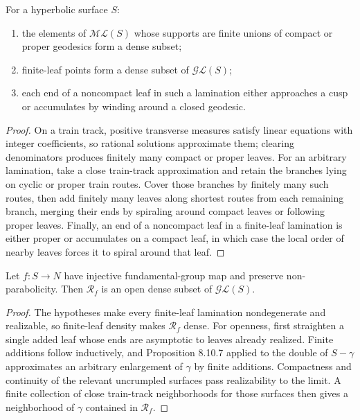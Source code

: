 \begin{proposition}
\label{thurston-ch08-finite-leaf-density}
For a hyperbolic surface $S$:
\begin{enumerate}
\item the elements of $\mathcal{ML}(S)$ whose supports are finite unions of compact or proper geodesics form a dense subset;
\item finite-leaf points form a dense subset of $\mathcal{GL}(S)$;
\item each end of a noncompact leaf in such a lamination either approaches a cusp or accumulates by winding around a closed geodesic.
\end{enumerate}
\end{proposition}
\begin{proof}\sketch On a train track, positive transverse measures satisfy linear equations with integer coefficients, so rational solutions approximate them; clearing denominators produces finitely many compact or proper leaves.  For an arbitrary lamination, take a close train-track approximation and retain the branches lying on cyclic or proper train routes.  Cover those branches by finitely many such routes, then add finitely many leaves along shortest routes from each remaining branch, merging their ends by spiraling around compact leaves or following proper leaves.  Finally, an end of a noncompact leaf in a finite-leaf lamination is either proper or accumulates on a compact leaf, in which case the local order of nearby leaves forces it to spiral around that leaf.\end{proof}

\begin{theorem}
\label{thurston-ch08-realization-dichotomy}
Let $f:S\to N$ have injective fundamental-group map and preserve non-parabolicity.  Then $\mathcal R_f$ is an open dense subset of $\mathcal{GL}(S)$.
\end{theorem}
\begin{proof}
\sketch The hypotheses make every finite-leaf lamination nondegenerate and realizable, so finite-leaf density makes $\mathcal R_f$ dense.  For openness, first straighten a single added leaf whose ends are asymptotic to leaves already realized.  Finite additions follow inductively, and Proposition 8.10.7 applied to the double of $S-\gamma$ approximates an arbitrary enlargement of $\gamma$ by finite additions.  Compactness and continuity of the relevant uncrumpled surfaces pass realizability to the limit.  A finite collection of close train-track neighborhoods for those surfaces then gives a neighborhood of $\gamma$ contained in $\mathcal R_f$.
\end{proof}


